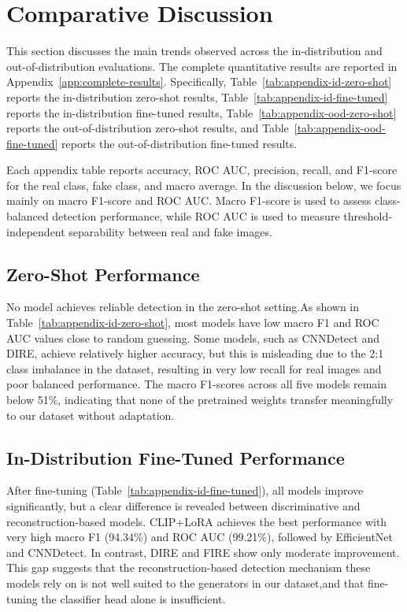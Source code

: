 \section{Comparative Discussion}
\label{sec:comparative-discussion}
This section discusses the main trends observed across the in-distribution and out-of-distribution evaluations. The complete quantitative results are reported in Appendix~\ref{app:complete-results}. Specifically, Table~\ref{tab:appendix-id-zero-shot} reports the in-distribution zero-shot results, Table~\ref{tab:appendix-id-fine-tuned} reports the in-distribution fine-tuned results, Table~\ref{tab:appendix-ood-zero-shot} reports the out-of-distribution zero-shot results, and Table~\ref{tab:appendix-ood-fine-tuned} reports the out-of-distribution fine-tuned results.

Each appendix table reports accuracy, ROC AUC, precision, recall, and F1-score for the real class, fake class, and macro average. In the discussion below, we focus mainly on macro F1-score and ROC AUC. Macro F1-score is used to assess class-balanced detection performance, while ROC AUC is used to measure threshold-independent separability between real and fake images.

\subsection{Zero-Shot Performance}
No model achieves reliable detection in the zero-shot setting.As shown in Table~\ref{tab:appendix-id-zero-shot}, most models have low macro F1 and ROC AUC values close to random guessing. Some models, such as CNNDetect and DIRE, achieve relatively higher accuracy, but this is misleading due to the 2:1 class imbalance in the dataset, resulting in very low recall for real images and poor balanced performance. The macro F1-scores across all five models remain below 51\%, indicating that none of the pretrained weights transfer meaningfully to our dataset without adaptation.

\subsection{In-Distribution Fine-Tuned Performance}
After fine-tuning (Table~\ref{tab:appendix-id-fine-tuned}), all models improve significantly, but a clear difference is revealed between discriminative and reconstruction-based models. CLIP+LoRA achieves the best performance with very high macro F1 (94.34\%) and ROC AUC (99.21\%), followed by EfficientNet and CNNDetect. In contrast, DIRE and FIRE show only moderate improvement. This gap suggests that the reconstruction-based detection mechanism these models rely on is not well suited to the generators in our dataset,and that fine-tuning the classifier head alone is insufficient.


